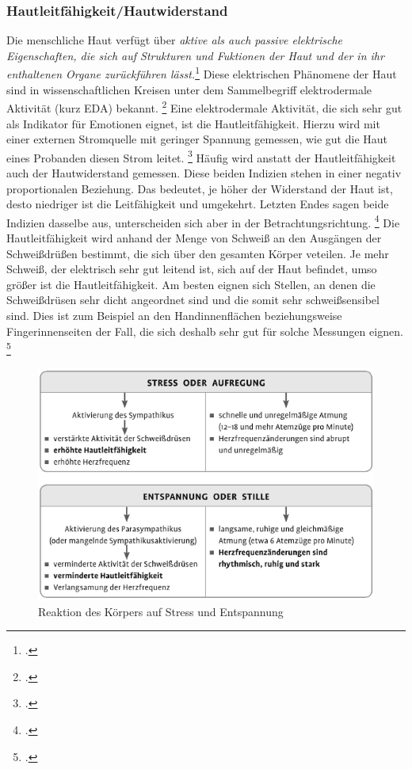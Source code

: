 \subsubsection{Hautleitfähigkeit/Hautwiderstand}
Die menschliche Haut verfügt über \glqq \textit{aktive als auch passive elektrische Eigenschaften, die sich auf Strukturen und Fuktionen der Haut und der in ihr enthaltenen Organe zurückführen lässt.}\grqq{}\footcite[][S. 2]{Bou88} Diese elektrischen Phänomene der Haut sind in wissenschaftlichen Kreisen unter dem Sammelbegriff elektrodermale Aktivität (kurz EDA) bekannt. \footcite[Vgl.][S. 2]{Bou88}
Eine elektrodermale Aktivität, die sich sehr gut als Indikator für Emotionen eignet, ist die Hautleitfähigkeit. Hierzu wird mit einer externen Stromquelle mit geringer Spannung gemessen, wie gut die Haut eines Probanden diesen Strom leitet. \footcite[Vgl. ][S.77]{Moe07} Häufig wird anstatt der Hautleitfähigkeit auch der Hautwiderstand gemessen. Diese beiden Indizien stehen in einer negativ proportionalen Beziehung. Das bedeutet, je höher der Widerstand der Haut ist, desto niedriger ist die Leitfähigkeit und umgekehrt. Letzten Endes sagen beide Indizien dasselbe aus, unterscheiden sich aber in der Betrachtungsrichtung. \footcite[Vgl. ][S. 28]{Die06} \newline
Die Hautleitfähigkeit wird anhand der Menge von Schweiß an den Ausgängen der Schweißdrüßen bestimmt, die sich über den gesamten Körper veteilen. Je mehr Schweiß, der elektrisch sehr gut leitend ist, sich auf der Haut befindet, umso größer ist die Hautleitfähigkeit. Am besten eignen sich  Stellen, an denen die Schweißdrüsen sehr dicht angeordnet sind und die somit sehr schweißsensibel sind. Dies ist zum Beispiel an den Handinnenflächen beziehungsweise Fingerinnenseiten der Fall, die sich deshalb sehr gut für solche Messungen eignen. \footcite[Vgl. ][S.77]{Moe07} 
\begin{figure}[h]
	\centering
	\includegraphics[width=16cm]{Bilder/symp.png}
	\caption[Reaktion des Körpers auf Stress und Entspannung]{Reaktion des Körpers auf Stress und Entspannung\footnotemark}
\end{figure}%
